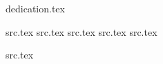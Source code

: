 


    
    
    \maketitle
    {dedication.tex}
    \tableofcontents 
    
    {src.tex}
    {src.tex}
    {src.tex}
    {src.tex}
    {src.tex}
    
    \appendixpage %
    \begin{appendix}
        {src.tex}
    \end{appendix}
    
    

    \listoffigures
    \listoftables


